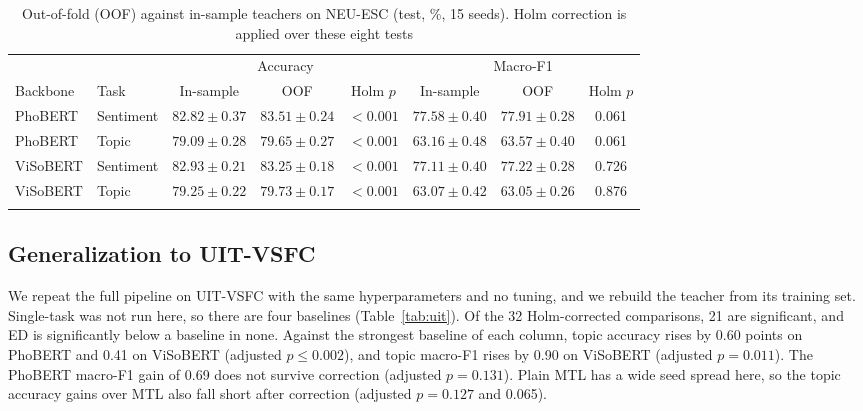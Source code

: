 \documentclass[pdflatex,sn-mathphys-num]{sn-jnl}%
\theoremstyle{thmstyleone}%
\theoremstyle{thmstyletwo}%
\theoremstyle{thmstylethree}%
\begin{document}
\begin{table}[!htb]
\caption{Out-of-fold (OOF) against in-sample teachers on NEU-ESC (test, \%, 15 seeds). Holm correction is applied over these eight tests}\label{tab:insample}
\footnotesize
\setlength{\tabcolsep}{3pt}
\begin{tabular*}{\textwidth}{@{\extracolsep\fill}llcccccc@{}}
\toprule
 & & \multicolumn{3}{c}{Accuracy} & \multicolumn{3}{c}{Macro-F1} \\
\cmidrule{3-5}\cmidrule{6-8}
Backbone & Task & In-sample & OOF & Holm $p$ & In-sample & OOF & Holm $p$ \\
\midrule
PhoBERT & Sentiment & $82.82\pm0.37$ & $83.51\pm0.24$ & $<0.001$ & $77.58\pm0.40$ & $77.91\pm0.28$ & 0.061 \\
PhoBERT & Topic & $79.09\pm0.28$ & $79.65\pm0.27$ & $<0.001$ & $63.16\pm0.48$ & $63.57\pm0.40$ & 0.061 \\
ViSoBERT & Sentiment & $82.93\pm0.21$ & $83.25\pm0.18$ & $<0.001$ & $77.11\pm0.40$ & $77.22\pm0.28$ & 0.726 \\
ViSoBERT & Topic & $79.25\pm0.22$ & $79.73\pm0.17$ & $<0.001$ & $63.07\pm0.42$ & $63.05\pm0.26$ & 0.876 \\
\botrule
\end{tabular*}
\end{table}

\subsection{Generalization to UIT-VSFC}\label{subsec:uit}

We repeat the full pipeline on UIT-VSFC with the same hyperparameters and no tuning, and we rebuild the teacher from its training set. Single-task was not run here, so there are four baselines (Table~\ref{tab:uit}). Of the 32 Holm-corrected comparisons, 21 are significant, and ED is significantly below a baseline in none. Against the strongest baseline of each column, topic accuracy rises by 0.60 points on PhoBERT and 0.41 on ViSoBERT (adjusted $p\le0.002$), and topic macro-F1 rises by 0.90 on ViSoBERT (adjusted $p=0.011$). The PhoBERT macro-F1 gain of 0.69 does not survive correction (adjusted $p=0.131$). Plain MTL has a wide seed spread here, so the topic accuracy gains over MTL also fall short after correction (adjusted $p=0.127$ and 0.065).
\end{document}
